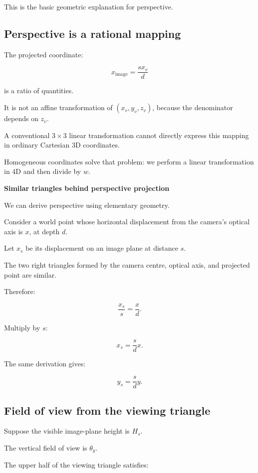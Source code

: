 This is the basic geometric explanation for perspective.

\subsection{Perspective is a rational mapping}\label{02-foundations-ii-ch033-perspective-is-a-rational-mapping}

The projected coordinate:

\[
 x_{\mathrm{image}}=\frac{s x_v}{d}
\]

is a ratio of quantities.

It is not an affine transformation of \((x_v,y_v,z_v)\), because the denominator depends on \(z_v\).

A conventional \(3\times3\) linear transformation cannot directly express this mapping in ordinary Cartesian 3D coordinates.

Homogeneous coordinates solve that problem: we perform a linear transformation in 4D and then divide by \(w\).

\textbf{Similar triangles behind perspective projection}

We can derive perspective using elementary geometry.

Consider a world point whose horizontal displacement from the camera's optical axis is \(x\), at depth \(d\).

Let \(x_s\) be its displacement on an image plane at distance \(s\).

The two right triangles formed by the camera centre, optical axis, and projected point are similar.

Therefore:

\[
 \frac{x_s}{s}=\frac{x}{d}.
\]

Multiply by \(s\):

\[
 \boxed{ x_s=\frac{s}{d}x }.
\]

The same derivation gives:

\[
 \boxed{ y_s=\frac{s}{d}y }.
\]

\subsection{Field of view from the viewing triangle}\label{02-foundations-ii-ch033-field-of-view-from-the-viewing-triangle}

Suppose the visible image-plane height is \(H_s\).

The vertical field of view is \(\theta_y\).

The upper half of the viewing triangle satisfies:


